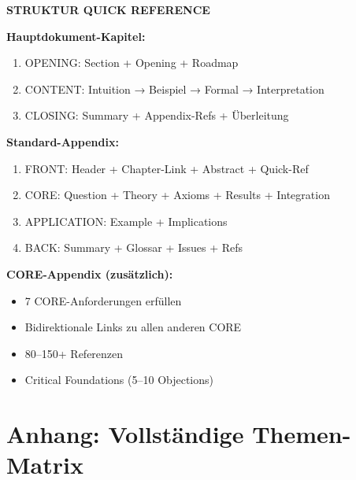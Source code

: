 \documentclass[12pt,a4paper]{article}
\begin{document}
\begin{tcolorbox}[colback=gray!10!white, colframe=black]
\textbf{STRUKTUR QUICK REFERENCE}

\textbf{Hauptdokument-Kapitel:}
\begin{enumerate}[nosep]
\item OPENING: Section + Opening + Roadmap
\item CONTENT: Intuition → Beispiel → Formal → Interpretation
\item CLOSING: Summary + Appendix-Refs + Überleitung
\end{enumerate}

\textbf{Standard-Appendix:}
\begin{enumerate}[nosep]
\item FRONT: Header + Chapter-Link + Abstract + Quick-Ref
\item CORE: Question + Theory + Axioms + Results + Integration
\item APPLICATION: Example + Implications
\item BACK: Summary + Glossar + Issues + Refs
\end{enumerate}

\textbf{CORE-Appendix (zusätzlich):}
\begin{itemize}[nosep]
\item 7 CORE-Anforderungen erfüllen
\item Bidirektionale Links zu allen anderen CORE
\item 80--150+ Referenzen
\item Critical Foundations (5--10 Objections)
\end{itemize}
\end{tcolorbox}

\section{Anhang: Vollständige Themen-Matrix}

\end{document}
